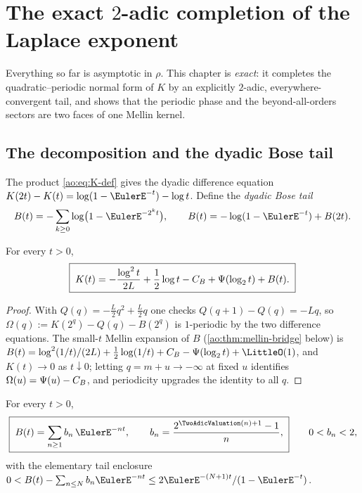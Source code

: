 \section{The exact \texorpdfstring{$2$}{2}-adic completion of the
Laplace exponent}
\label{ao:sec:dyadic-completion}

Everything so far is asymptotic in $\rho$.  This chapter is
\emph{exact}: it completes the quadratic--periodic normal form of
$K$ by an explicitly $2$-adic, everywhere-convergent tail, and shows
that the periodic phase and the beyond-all-orders sectors are two
faces of one Mellin kernel.

\subsection{The decomposition and the dyadic Bose tail}

The product \eqref{ao:eq:K-def} gives the dyadic difference equation
$K(2t)-K(t)=\log(1-\EulerE^{-t})-\log t$.  Define the \emph{dyadic Bose
tail}
\begin{equation}
 B(t)=-\sum_{k\ge0}\log\bigl(1-\EulerE^{-2^{k}t}\bigr),
 \qquad
 B(t)=-\log(1-\EulerE^{-t})+B(2t).
 \label{ao:eq:B-def}
\end{equation}

\begin{theorem}
\label{ao:thm:K-decomposition}
For every $t>0$,
\begin{equation}
 \boxed{\;
 K(t)=-\frac{\log^{2}t}{2L}+\frac12\log t-C_B
 +\Psi(\log_2t)+B(t).
 \;}
 \label{ao:eq:K-decomposition}
\end{equation}
\end{theorem}

\begin{proof}
With $Q(q)=-\tfrac L2q^{2}+\tfrac L2q$ one checks
$Q(q+1)-Q(q)=-Lq$, so
$\Omega(q):=K(2^{q})-Q(q)-B(2^{q})$ is $1$-periodic by the two
difference equations.  The small-$t$ Mellin expansion of $B$
(\cref{ao:thm:mellin-bridge} below) is
$B(t)=\log^{2}(1/t)/(2L)+\tfrac12\log(1/t)+\CB-\Psi(\log_2t)+
\LittleO(1)$, and $K(t)\to0$ as $t\downarrow0$; letting
$q=m+u\to-\infty$ at fixed $u$ identifies
$\Omega(u)=\Psi(u)-C_B$, and periodicity upgrades the identity to
all $q$.
\end{proof}

\begin{theorem}
\label{ao:thm:B-2adic}
For every $t>0$,
\begin{equation}
 \boxed{\;
 B(t)=\sum_{n\ge1}b_n\,\EulerE^{-nt},
 \qquad
 b_n=\frac{2^{\TwoAdicValuation(n)+1}-1}{n},
 \;}
 \qquad
 0<b_n<2,
 \label{ao:eq:B-2adic}
\end{equation}
with the elementary tail enclosure
$0<B(t)-\sum_{n\le N}b_n\EulerE^{-nt}\le2\EulerE^{-(N+1)t}/(1-\EulerE^{-t})$.
\end{theorem}


